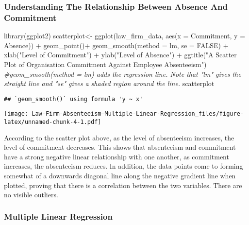 \documentclass[
]{article}
\newenvironment{Shaded}{\begin{snugshade}}{\end{snugshade}}
\newcommand{\AttributeTok}[1]{\textcolor[rgb]{0.77,0.63,0.00}{#1}}
\newcommand{\CommentTok}[1]{\textcolor[rgb]{0.56,0.35,0.01}{\textit{#1}}}
\newcommand{\ConstantTok}[1]{\textcolor[rgb]{0.00,0.00,0.00}{#1}}
\newcommand{\FunctionTok}[1]{\textcolor[rgb]{0.00,0.00,0.00}{#1}}
\newcommand{\NormalTok}[1]{#1}
\newcommand{\OtherTok}[1]{\textcolor[rgb]{0.56,0.35,0.01}{#1}}
\newcommand{\SpecialCharTok}[1]{\textcolor[rgb]{0.00,0.00,0.00}{#1}}
\newcommand{\StringTok}[1]{\textcolor[rgb]{0.31,0.60,0.02}{#1}}
\begin{document}
\hypertarget{understanding-the-relationship-between-absence-and-commitment}{%
\subsubsection{Understanding The Relationship Between Absence And
Commitment}\label{understanding-the-relationship-between-absence-and-commitment}}

\begin{Shaded}
\begin{Highlighting}[]
\FunctionTok{library}\NormalTok{(ggplot2)}
\NormalTok{scatterplot}\OtherTok{\textless{}{-}} \FunctionTok{ggplot}\NormalTok{(law\_firm\_data, }\FunctionTok{aes}\NormalTok{(}\AttributeTok{x =}\NormalTok{ Commitment, }\AttributeTok{y =}\NormalTok{ Absence)) }\SpecialCharTok{+} \FunctionTok{geom\_point}\NormalTok{()}\SpecialCharTok{+} \FunctionTok{geom\_smooth}\NormalTok{(}\AttributeTok{method =}\NormalTok{ lm, }\AttributeTok{se =} \ConstantTok{FALSE}\NormalTok{) }\SpecialCharTok{+} \FunctionTok{xlab}\NormalTok{(}\StringTok{"Level of Commitment"}\NormalTok{) }\SpecialCharTok{+} \FunctionTok{ylab}\NormalTok{(}\StringTok{"Level of Absence"}\NormalTok{) }\SpecialCharTok{+} \FunctionTok{ggtitle}\NormalTok{(}\StringTok{"A Scatter Plot of Organisation Commitment Against Employee Absenteeism"}\NormalTok{) }\CommentTok{\#geom\_smooth(method = lm) adds the regression line. Note that "lm" gives the straight line and "se" gives a shaded region around the line.}
\NormalTok{scatterplot}
\end{Highlighting}
\end{Shaded}

\begin{verbatim}
## `geom_smooth()` using formula 'y ~ x'
\end{verbatim}

\texttt{[image: Law-Firm-Absenteeism---Multiple-Linear-Regression\_files/figure-latex/unnamed-chunk-4-1.pdf]}

According to the scatter plot above, as the level of absenteeism
increases, the level of commitment decreases. This shows that
absenteeism and commitment have a strong negative linear relationship
with one another, as commitment increases, the absenteeism reduces. In
addition, the data points come to forming somewhat of a downwards
diagonal line along the negative gradient line when plotted, proving
that there is a correlation between the two variables. There are no
visible outliers.

\hypertarget{multiple-linear-regression}{%
\subsubsection{Multiple Linear
Regression}\label{multiple-linear-regression}}
\end{document}

